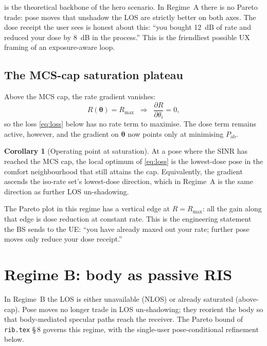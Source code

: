 \documentclass[11pt,a4paper]{article}
\theoremstyle{definition}
\newtheorem{corollary}[corollary]{Corollary}
\newcommand{\thetab}{\bm{\theta}}
\newcommand{\Pabs}{P_{\mathrm{ab}}}
\begin{document}
 is the theoretical backbone of the hero
scenario.  In Regime~A there is no Pareto trade: pose moves that
unshadow the LOS are strictly better on both axes.  The dose
receipt the user sees is honest about this: ``you bought
\SI{12}{dB} of rate and reduced your dose by \SI{8}{dB} in the
process.''  This is the friendliest possible UX framing of an
exposure-aware loop.

\subsection{The MCS-cap saturation plateau}

Above the MCS cap, the rate gradient vanishes:
\begin{equation}\label{eq:cap-zero}
  R(\thetab)=R_{\max}\;\;\Rightarrow\;\;
  \frac{\partial R}{\partial\theta_i}=0,
\end{equation}
so the loss \eqref{eq:loss} below has no rate term to maximise.
The dose term remains active, however, and the gradient on
$\thetab$ now points only at minimising $\Pabs$.

\begin{corollary}[Operating point at saturation]\label{cor:cap}
At a pose where the SINR has reached the MCS cap, the local optimum
of \eqref{eq:loss} is the lowest-dose pose in the comfort
neighbourhood that still attains the cap.  Equivalently, the
gradient ascends the iso-rate set's lowest-dose direction, which
in Regime~A is the same direction as further LOS un-shadowing.
\end{corollary}

The Pareto plot in this regime has a vertical edge at $R=R_{\max}$:
all the gain along that edge is dose reduction at constant rate.
This is the engineering statement the BS sends to the UE: ``you
have already maxed out your rate; further pose moves only reduce
your dose receipt.''

\section{Regime B: body as passive RIS}\label{sec:rib-pareto}

In Regime~B the LOS is either unavailable (NLOS) or already
saturated (above-cap).  Pose moves no longer trade in
LOS un-shadowing; they reorient the body so that body-mediated
specular paths reach the receiver.  The Pareto bound of
\texttt{rib.tex} \S\,8 governs this regime, with the
single-user pose-conditional refinement below.
\end{document}
